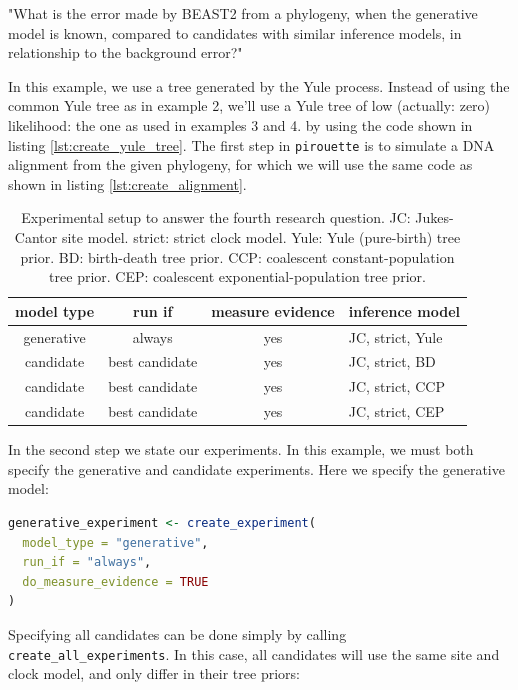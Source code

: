 \documentclass{article}
\begin{document}
"What is the error made by BEAST2 from a phylogeny, 
when the generative model is known, 
compared to candidates with similar inference models, 
in relationship to the background error?"

In this example, we use a tree generated by the Yule process.
Instead of using the common Yule tree as in example 2, we'll use
a Yule tree of low (actually: zero) likelihood: 
the one as used in examples 3 and 4.
by using the code shown in listing \ref{lst:create_yule_tree}.
The first step in \verb;pirouette; is to simulate a DNA alignment 
from the given phylogeny, for which we will use the same code 
as shown in listing \ref{lst:create_alignment}.

\begin{table}
  \begin{tabular}{ | c | c | c | l | }
    \hline
    \textbf{model type} & \textbf{run if} & \textbf{measure evidence} & \textbf{inference model} \\ 
    \hline
    generative & always         & yes & JC, strict, Yule \\
    candidate  & best candidate & yes & JC, strict, BD \\
    candidate  & best candidate & yes & JC, strict, CCP \\
    candidate  & best candidate & yes & JC, strict, CEP \\
    \hline
  \end{tabular}
  \caption{
    Experimental setup to answer the fourth research question.
    JC: Jukes-Cantor site model.
    strict: strict clock model.
    Yule: Yule (pure-birth) tree prior.
    BD: birth-death tree prior.
    CCP: coalescent constant-population tree prior.
    CEP: coalescent exponential-population tree prior.
  }
  \label{tab:experiment_5}
\end{table}

In the second step we state our experiments. 
In this example, we must both specify the generative and candidate experiments. Here we specify the generative model:

\begin{lstlisting}[language=R, floatplacement=H, frame=single]
generative_experiment <- create_experiment(
  model_type = "generative",
  run_if = "always",
  do_measure_evidence = TRUE
)
\end{lstlisting}

Specifying all candidates can be done simply by calling \verb;create_all_experiments;. In this case, all candidates will use the same site and clock model, and only differ in their tree priors:
\end{document}
